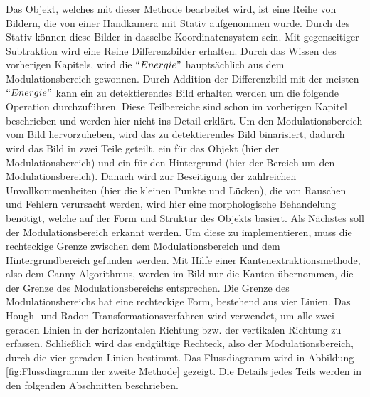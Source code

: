 Das Objekt, welches mit dieser Methode bearbeitet wird, ist eine Reihe von Bildern, die von einer Handkamera mit Stativ aufgenommen wurde. Durch des Stativ können diese Bilder in dasselbe Koordinatensystem sein. Mit gegenseitiger Subtraktion wird eine Reihe Differenzbilder erhalten. Durch das Wissen des vorherigen Kapitels, wird die $``Energie"$ hauptsächlich aus dem Modulationsbereich gewonnen. Durch Addition der Differenzbild mit der meisten $``Energie"$ kann ein zu detektierendes Bild erhalten werden um die folgende Operation durchzuführen. Diese Teilbereiche sind schon im vorherigen Kapitel beschrieben und werden hier nicht ins Detail erklärt. Um den Modulationsbereich vom Bild hervorzuheben, wird das zu detektierendes Bild binarisiert, dadurch wird das Bild in zwei Teile geteilt, ein für das Objekt (hier der Modulationsbereich) und ein für den Hintergrund (hier der Bereich um den Modulationsbereich). Danach wird zur Beseitigung der zahlreichen Unvollkommenheiten (hier die kleinen Punkte und Lücken), die von Rauschen und Fehlern verursacht werden, wird hier eine morphologische Behandelung benötigt, welche auf der Form und Struktur des Objekts basiert. Als Nächstes soll der Modulationsbereich erkannt werden. Um diese zu implementieren, muss die rechteckige Grenze zwischen dem Modulationsbereich und dem Hintergrundbereich gefunden werden. Mit Hilfe einer Kantenextraktionsmethode, also dem Canny-Algorithmus, werden im Bild nur die Kanten übernommen, die der Grenze des Modulationsbereichs entsprechen. Die Grenze des Modulationsbereichs hat eine rechteckige Form, bestehend aus vier Linien. Das Hough- und Radon-Transformationsverfahren wird verwendet, um alle zwei geraden Linien in der horizontalen Richtung bzw. der vertikalen Richtung zu erfassen. Schließlich wird das endgültige Rechteck, also der Modulationsbereich, durch die vier geraden Linien bestimmt. Das Flussdiagramm wird in Abbildung \ref{fig:Flussdiagramm der zweite Methode} gezeigt. Die Details jedes Teils werden in den folgenden Abschnitten beschrieben.

